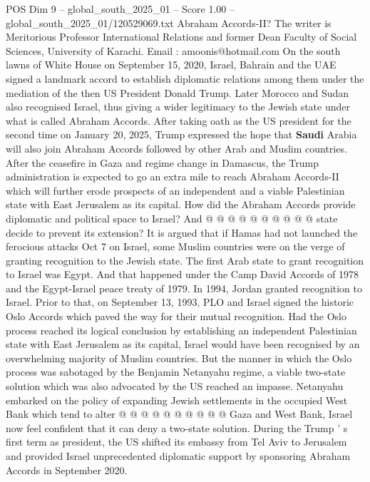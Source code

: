 \begin{textsample}{POS Dim 9 – global\_south\_2025\_01 – Score 1.00 – global\_south\_2025\_01/120529069.txt}  \label{ex:f9_pos_309}
Abraham Accords-II?
The writer is Meritorious Professor International Relations and former Dean Faculty of Social Sciences, University of Karachi.
Email : amoonis@hotmail.com On the south lawns of White House on September 15, 2020, Israel, Bahrain and the UAE signed a landmark accord to establish diplomatic relations among them under the mediation of the then US President Donald Trump.
Later Morocco and Sudan also recognised Israel, thus giving a wider legitimacy to the Jewish state under what is called Abraham Accords.
After taking oath as the US president for the second time on January 20, 2025, Trump expressed the hope that \textbf{Saudi} Arabia will also join Abraham Accords followed by other Arab and Muslim countries.
After the ceasefire in Gaza and regime change in Damascus, the Trump administration is expected to go an extra mile to reach Abraham Accords-II which will further erode prospects of an independent and a viable Palestinian state with East Jerusalem as its capital.
How did the Abraham Accords provide diplomatic and political space to Israel?
And @ @ @ @ @ @ @ @ @ @ state decide to prevent its extension?
It is argued that if Hamas had not launched the ferocious attacks Oct 7 on Israel, some Muslim countries were on the verge of granting recognition to the Jewish state.
The first Arab state to grant recognition to Israel was Egypt.
And that happened under the Camp David Accords of 1978 and the Egypt-Israel peace treaty of 1979.
In 1994, Jordan granted recognition to Israel.
Prior to that, on September 13, 1993, PLO and Israel signed the historic Oslo Accords which paved the way for their mutual recognition.
Had the Oslo process reached its logical conclusion by establishing an independent Palestinian state with East Jerusalem as its capital, Israel would have been recognised by an overwhelming majority of Muslim countries.
But the manner in which the Oslo process was sabotaged by the Benjamin Netanyahu regime, a viable two-state solution which was also advocated by the US reached an impasse.
Netanyahu embarked on the policy of expanding Jewish settlements in the occupied West Bank which tend to alter @ @ @ @ @ @ @ @ @ @ Gaza and West Bank, Israel now feel confident that it can deny a two-state solution.
During the Trump ' s first term as president, the US shifted its embassy from Tel Aviv to Jerusalem and provided Israel unprecedented diplomatic support by sponsoring Abraham Accords in September 2020.

\end{textsample}
